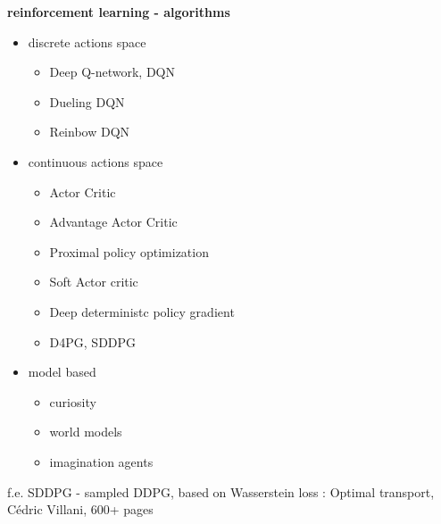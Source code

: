 \documentclass[xcolor=dvipsnames]{beamer}
\begin{document}
\begin{frame}{\bf reinforcement learning - algorithms}
   \begin{itemize}
    \item discrete actions space

        \begin{itemize}
          \item Deep Q-network, DQN
          \item Dueling DQN
          \item Reinbow DQN
        \end{itemize}

    \item continuous actions space
    
        \begin{itemize}
          \item Actor Critic
          \item Advantage Actor Critic
          \item Proximal policy optimization
          \item Soft Actor critic
          \item Deep deterministc policy gradient
          \item D4PG, SDDPG
        \end{itemize}

    \item model based
    
        \begin{itemize}
          \item curiosity
          \item world models
          \item imagination agents
        \end{itemize}

  \end{itemize}

  f.e. SDDPG - sampled DDPG, based on Wasserstein loss : Optimal transport, Cédric Villani, 600+ pages

\end{frame}
\end{document}

